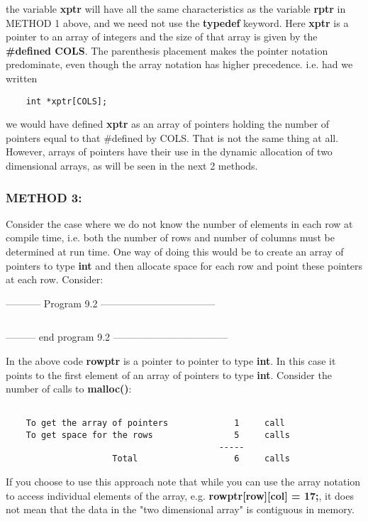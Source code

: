 the variable \textbf{xptr} will have all the same characteristics as the
variable \textbf{rptr} in METHOD 1 above, and we need not use the
\textbf{typedef} keyword. Here \textbf{xptr} is a pointer to an array of
integers and the size of that array is given by the \textbf{\#defined
COLS}. The parenthesis placement makes the pointer notation predominate,
even though the array notation has higher precedence. i.e. had we
written

\begin{verbatim}
    int *xptr[COLS];
\end{verbatim}

we would have defined \textbf{xptr} as an array of pointers holding the
number of pointers equal to that \#defined by COLS. That is not the same
thing at all. However, arrays of pointers have their use in the dynamic
allocation of two dimensional arrays, as will be seen in the next 2
methods.

\hypertarget{method-3}{%
\subsubsection{METHOD 3:}\label{method-3}}

Consider the case where we do not know the number of elements in each
row at compile time, i.e. both the number of rows and number of columns
must be determined at run time. One way of doing this would be to create
an array of pointers to type \textbf{int} and then allocate space for
each row and point these pointers at each row. Consider:

-----------  Program 9.2  -----------------------------------
\inputminted{c}{../src/ch9-2.c}
--------- end program 9.2 -----------------------------------

In the above code \textbf{rowptr} is a pointer to pointer to type
\textbf{int}. In this case it points to the first element of an array of
pointers to type \textbf{int}. Consider the number of calls to
\textbf{malloc()}:

\begin{verbatim}

    To get the array of pointers             1     call
    To get space for the rows                5     calls
                                          -----
                     Total                   6     calls
\end{verbatim}

If you choose to use this approach note that while you can use the array
notation to access individual elements of the array, e.g.
\textbf{rowptr{[}row{]}{[}col{]} = 17;}, it does not mean that the data
in the "two dimensional array" is contiguous in memory.


